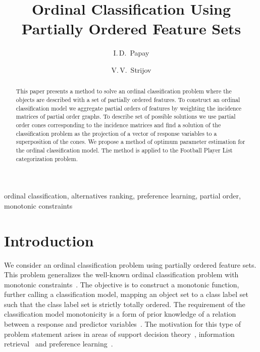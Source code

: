 \documentclass[12pt,preprint]{elsarticle}
\begin{document}
\title{Ordinal Classification Using Partially Ordered Feature Sets}
 

\author[mipt]{I.\,D.~Papay}

\author[mipt,ccas]{V.\,V.~Strijov}


\begin{abstract}
This paper presents a method to solve an ordinal classification problem where the objects are described with a set of partially ordered features.
To construct an ordinal classification model we aggregate partial orders of features by weighting the incidence matrices of partial order graphs. To describe set of possible solutions we use partial order cones corresponding to the incidence matrices and find a solution of the classification problem as the projection of a vector of response variables to a superposition of the cones. We propose a method of optimum parameter estimation for the ordinal classification model. The method is applied to the Football Player List categorization problem.
\end{abstract}

\begin{keyword}
ordinal classification, alternatives ranking, preference learning, partial order, monotonic constraints
\end{keyword}

\maketitle

\section{Introduction}
We consider an ordinal classification problem using partially ordered feature sets. This problem generalizes the well-known ordinal classification problem with monotonic constraints~\cite{Kotlowski2013, Corrente2013, Ali2020}. The objective is to construct a monotonic function, further calling a classification model, mapping an object set to a class label set such that the class label set is strictly totally ordered. The requirement of the classification model monotonicity is a form of prior knowledge of a relation between a response and predictor variables~\cite{raey, Jorge2024, Eduardo2022}. The motivation for this type of problem statement arises in areas of support decision theory~\cite{Enrique2023,Ameed2022,Yossi2022}, information retrieval~\cite{Schafer2007,Trotman2005,Spirin2011} and preference learning~\cite{Fuernkranz2011, Bofei2024}.
\end{document}
